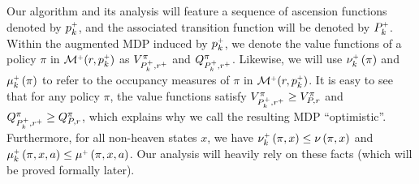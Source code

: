 Our algorithm and its analysis will feature a sequence of ascension functions denoted by $p_k^\upplus$, and the associated transition function will be denoted by $P_k^\upplus$. Within the augmented MDP induced by $p_k^\upplus$, we denote the value functions of a policy $\pi$ in $\cM^\upplus(r,p_k^\upplus)$ as $V_{P_k^\upplus, r^\upplus}^\pi$ and $Q_{P_k^\upplus, r^\upplus}^\pi$. Likewise, we will use $\nu_k^\upplus \spr{\pi}$ and $\mu_k^\upplus \spr{\pi}$ to refer to the occupancy measures of $\pi$ in $\cM^\upplus(r,p_k^\upplus)$. It is easy to see that for any policy $\pi$, the value functions satisfy $V_{P_k^\upplus, r^\upplus}^\pi \ge V_{P, r}^\pi$ and $Q_{P_k^\upplus, r^\upplus}^\pi \ge Q_{P, r}^\pi$, which explains why we call the resulting MDP ``optimistic''. Furthermore, for all non-heaven states $x$, we have $\nu_k^\upplus \spr{\pi,x} \le \nu\spr{\pi,x}$ and $\mu_k^\upplus \spr{\pi,x,a} \le \mu^\upplus \spr{\pi,x,a}$. Our analysis will heavily rely on these facts (which will be proved formally later).

